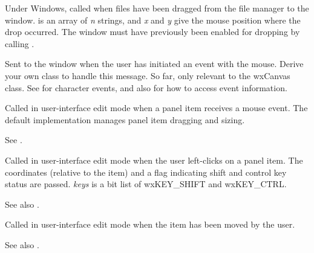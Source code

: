 Under Windows, called when files have been dragged from the file manager to the window.
 is an array of {\it n} strings, and {\it x} and {\it y} give the mouse position
where the drop occurred. The window must have previously been enabled for dropping by calling
\rtfsp{}.

\label{wxevthandleronevent}


Sent to the window when the user has initiated an event with the
mouse. Derive your own class to handle this message. So far,
only relevant to the wxCanvas class. See  for character
events, and also  for how to access event information.



Called in user-interface edit mode when a panel item receives a mouse event.
The default implementation manages panel item dragging and sizing.

See .



Called in user-interface edit mode when the user left-clicks on a panel item.
The coordinates (relative to the item) and a flag indicating shift and control
key status are passed. {\it keys} is a bit list of wxKEY\_SHIFT and wxKEY\_CTRL.

See also .



Called in user-interface edit mode when the item has been moved by the user.

See also .



